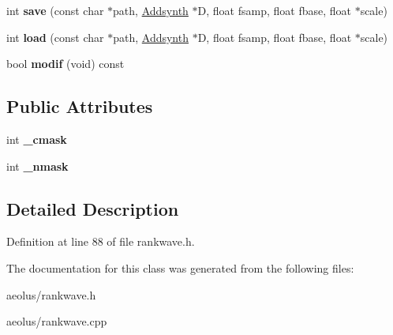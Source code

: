 \begin{DoxyCompactItemize}
int {\bfseries save} (const char $\ast$path, \hyperlink{class_addsynth}{Addsynth} $\ast$D, float fsamp, float fbase, float $\ast$scale)
\item 
\mbox{\label{class_rankwave_a59828f30350a78fdb49622219615251e}} 
int {\bfseries load} (const char $\ast$path, \hyperlink{class_addsynth}{Addsynth} $\ast$D, float fsamp, float fbase, float $\ast$scale)
\item 
\mbox{\label{class_rankwave_a17f64e00bc942cb35aedd679a860897e}} 
bool {\bfseries modif} (void) const
\end{DoxyCompactItemize}
\subsection*{Public Attributes}
\begin{DoxyCompactItemize}
\item 
\mbox{\label{class_rankwave_ad0359e7a96d9a6781617c823de566693}} 
int {\bfseries \+\_\+cmask}
\item 
\mbox{\label{class_rankwave_a1f2882a9747f57d55c02194e54afd914}} 
int {\bfseries \+\_\+nmask}
\end{DoxyCompactItemize}


\subsection{Detailed Description}


Definition at line 88 of file rankwave.\+h.



The documentation for this class was generated from the following files\+:\begin{DoxyCompactItemize}
\item 
aeolus/rankwave.\+h\item 
aeolus/rankwave.\+cpp\end{DoxyCompactItemize}
